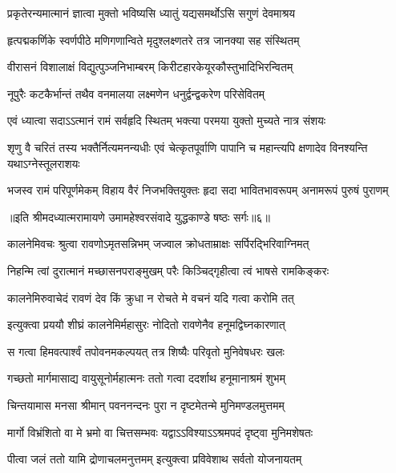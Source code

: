 \twolineshloka
{प्रकृतेरन्यमात्मानं ज्ञात्वा मुक्तो भविष्यसि}
{ध्यातुं यद्यसमर्थोऽसि सगुणं देवमाश्रय} %

\twolineshloka
{हृत्पद्मकर्णिके स्वर्णपीठे मणिगणान्विते}
{मृदुश्लक्ष्णतरे तत्र जानक्या सह संस्थितम्} %

\twolineshloka
{वीरासनं विशालाक्षं विद्युत्पुञ्जनिभाम्बरम्}
{किरीटहारकेयूरकौस्तुभादिभिरन्वितम्} %

\twolineshloka
{नूपुरैः कटकैर्भान्तं तथैव वनमालया}
{लक्ष्मणेन धनुर्द्वन्द्वकरेण परिसेवितम्} %

\twolineshloka
{एवं ध्यात्वा सदाऽऽत्मानं रामं सर्वहृदि स्थितम्}
{भक्त्या परमया युक्तो मुच्यते नात्र संशयः} %

\threelineshloka
{शृणु वै चरितं तस्य भक्तैर्नित्यमनन्यधीः}
{एवं चेत्कृतपूर्वाणि पापानि च महान्त्यपि}
{क्षणादेव विनश्यन्ति यथाऽग्नेस्तूलराशयः} %

\fourlineindentedshloka
{भजस्व रामं परिपूर्णमेकम्}
{विहाय वैरं निजभक्तियुक्तः}
{हृदा सदा भावितभावरूपम्}
{अनामरूपं पुरुषं पुराणम्} %

{॥इति श्रीमदध्यात्मरामायणे उमामहेश्वरसंवादे युद्धकाण्डे षष्ठः
सर्गः॥६॥
}





\twolineshloka
{कालनेमिवचः श्रुत्वा रावणोऽमृतसन्निभम्}
{जज्वाल क्रोधताम्राक्षः सर्पिरद्भिरिवाग्निमत्} %

\twolineshloka
{निहन्मि त्वां दुरात्मानं मच्छासनपराङ्मुखम्}
{परैः किञ्चिद्गृहीत्वा त्वं भाषसे रामकिङ्करः} %

\twolineshloka
{कालनेमिरुवाचेदं रावणं देव किं क्रुधा}
{न रोचते मे वचनं यदि गत्वा करोमि तत्} %

\twolineshloka
{इत्युक्त्वा प्रययौ शीघ्रं कालनेमिर्महासुरः}
{नोदितो रावणेनैव हनूमद्विघ्नकारणात्} %

\twolineshloka
{स गत्वा हिमवत्पार्श्वं तपोवनमकल्पयत्}
{तत्र शिष्यैः परिवृतो मुनिवेषधरः खलः} %

\twolineshloka
{गच्छतो मार्गमासाद्य वायुसूनोर्महात्मनः}
{ततो गत्वा ददर्शाथ हनूमानाश्रमं शुभम्} %

\twolineshloka
{चिन्तयामास मनसा श्रीमान् पवननन्दनः}
{पुरा न दृष्टमेतन्मे मुनिमण्डलमुत्तमम्} %

\twolineshloka
{मार्गो विभ्रंशितो वा मे भ्रमो वा चित्तसम्भवः}
{यद्वाऽऽविश्याऽऽश्रमपदं दृष्ट्वा मुनिमशेषतः} %

\twolineshloka
{पीत्वा जलं ततो यामि द्रोणाचलमनुत्तमम्}
{इत्युक्त्वा प्रविवेशाथ सर्वतो योजनायतम्} %

